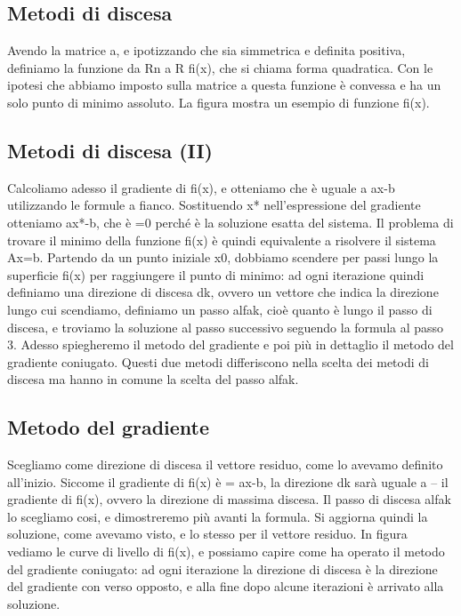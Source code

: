 \documentclass[a4paper]{article}
\begin{document}
\subsection*{Metodi di discesa}
Avendo la matrice a, e ipotizzando che sia simmetrica e definita positiva, definiamo la funzione da Rn a R fi(x), che si chiama forma quadratica. Con le ipotesi che abbiamo imposto sulla matrice a questa funzione è convessa e ha un solo punto di minimo assoluto. La figura mostra un esempio di funzione fi(x).

\subsection*{Metodi di discesa (II)}
Calcoliamo adesso il gradiente di fi(x), e otteniamo che è uguale a ax-b utilizzando le formule a fianco. Sostituendo x* nell’espressione del gradiente otteniamo ax*-b, che è =0 perché è la soluzione esatta del sistema. Il problema di trovare il minimo della funzione fi(x) è quindi equivalente a risolvere il sistema Ax=b.
Partendo da un punto iniziale x0, dobbiamo scendere per passi lungo la superficie fi(x) per raggiungere il punto di minimo: ad ogni iterazione quindi definiamo una direzione di discesa dk, ovvero un vettore che indica la direzione lungo cui scendiamo, definiamo un passo alfak, cioè quanto è lungo il passo di discesa, e troviamo la soluzione al passo successivo seguendo la formula al passo 3.
Adesso spiegheremo il metodo del gradiente e poi più in dettaglio il metodo del gradiente coniugato. Questi due metodi differiscono nella scelta dei metodi di discesa ma hanno in comune la scelta del passo alfak.

\subsection*{Metodo del gradiente}
Scegliamo come direzione di discesa il vettore residuo, come lo avevamo definito all’inizio. Siccome il gradiente di fi(x) è = ax-b, la direzione dk sarà uguale a – il gradiente di fi(x), ovvero la direzione di massima discesa. Il passo di discesa alfak lo scegliamo cosi, e dimostreremo più avanti la formula.
Si aggiorna quindi la soluzione, come avevamo visto, e lo stesso per il vettore residuo.
In figura vediamo le curve di livello di fi(x), e possiamo capire come ha operato il metodo del gradiente coniugato: ad ogni iterazione la direzione di discesa è la direzione del gradiente con verso opposto, e alla fine dopo alcune iterazioni è arrivato alla soluzione.
\end{document}

